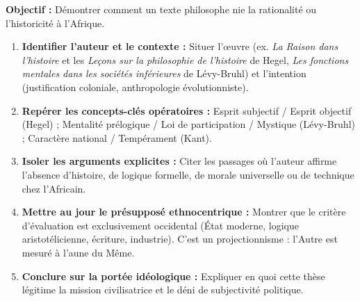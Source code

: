 \documentclass[11pt]{article}
\newcommand{\cle}[1]{{\popxbold\color{popdark}#1}}
\begin{document}
\begin{methode}
\textbf{Objectif :} Démontrer comment un texte philosophe nie la rationalité ou l'historicité à l'Afrique.
\begin{enumerate}
    \item \textbf{Identifier l'auteur et le contexte :} Situer l'œuvre (ex. \emph{La Raison dans l'histoire} et les \emph{Leçons sur la philosophie de l'histoire} de Hegel, \emph{Les fonctions mentales dans les sociétés inférieures} de Lévy-Bruhl) et l'intention (justification coloniale, anthropologie évolutionniste).
    \item \textbf{Repérer les concepts-clés opératoires :} \cle{Esprit subjectif} / \cle{Esprit objectif} (Hegel) ; \cle{Mentalité prélogique} / \cle{Loi de participation} / \cle{Mystique} (Lévy-Bruhl) ; \cle{Caractère national} / \cle{Tempérament} (Kant).
    \item \textbf{Isoler les arguments explicites :} Citer les passages où l'auteur affirme l'absence d'histoire, de logique formelle, de morale universelle ou de technique chez l'Africain.
    \item \textbf{Mettre au jour le présupposé ethnocentrique :} Montrer que le critère d'évaluation est exclusivement occidental (État moderne, logique aristotélicienne, écriture, industrie). C'est un \cle{projectionnisme} : l'Autre est mesuré à l'aune du Même.
    \item \textbf{Conclure sur la portée idéologique :} Expliquer en quoi cette thèse légitime la \cle{mission civilisatrice} et le déni de subjectivité politique.
\end{enumerate}
\end{methode}
\end{document}
